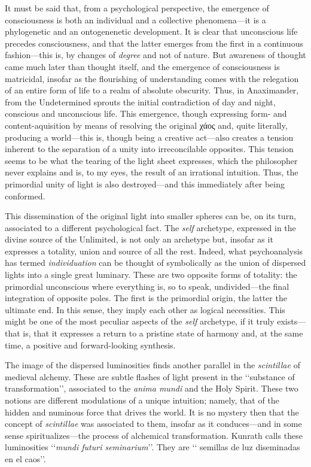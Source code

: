\documentclass[a4paper]{article}
\begin{document}
It must be said that, from a psychological perspective, the emergence of
consciousness is both an individual and a collective phenomena---it is a 
phylogenetic and an ontogenenetic development. It is clear that unconscious
life precedes consciousness, and that the latter emerges from the first in a
continuous fashion---this is, by changes of \textit{degree} and not of
nature. But awareness of thought came much later than thought itself, and
the emergence of consciousness is matricidal, insofar as the
flourishing of understanding comes with the relegation of an entire form of life
to a realm of absolute obscurity. Thus, in Anaximander, from the Undetermined
sprouts the initial contradiction of day and night, conscious and unconscious
life. This emergence, though expressing form- and content-aquisition by
means of resolving the original χάος and, quite literally, producing a
world---this is, though being a creative act---also creates a tension inherent to the
separation of a unity into irreconcilable opposites. This tension seems to be
what the tearing of the light sheet expresses, which the philosopher never
explains and is, to my eyes, the result of an irrational intuition. Thus, the
primordial unity of light is also destroyed---and this immediately after being
conformed.

This dissemination of the original light into smaller spheres can be, on its
turn, associated to a different psychological fact. The \textit{self} archetype,
expressed in the divine source of the Unlimited, is not only an archetype but,
insofar as it expresses a totality, union and source of all the rest. Indeed,
what psychoanalysis has termed \textit{individuation} can be thought of
symbolically as the union of dispersed lights into a single great luminary.
These are two opposite forms of totality: the primordial unconscious where
everything is, so to speak, undivided---the final integration of opposite poles.
The first is the primordial origin, the latter the ultimate end. In this sense,
they imply each other as logical necessities. This might be one of the most
peculiar aspects of the \textit{self} archetype, if it truly exists---that is,
that it expresses a return to a pristine state of harmony and, at the same
time, a positive and forward-looking synthesis.

The image of the dispersed luminosities finds another parallel in the
\textit{scintillae} of medieval alchemy. These are subtle flashes of light
present in the \lq\lq substance of transformation\rq\rq{}, associated to the
\textit{anima mundi} and the Holy Spirit. These two notions are different
modulations of a unique intuition; namely, that of the hidden and numinous force
that drives the world. It is no mystery then that the concept of
\textit{scintillae} was associated to them, insofar as it conduces---and in some
sense spiritualizes---the process of alchemical transformation. Kunrath calls
these luminosities \lq\lq \textit{mundi futuri seminarium}\rq\rq{}. They are \lq\lq
semillas de luz diseminadas en el caos\rq\rq{}.
\end{document}
